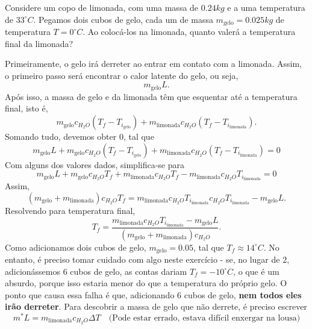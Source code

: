 \documentclass[phsyicsII_notes.tex]{subfiles}
\begin{document}
\begin{example}
	Considere um copo de limonada, com uma massa de \(0.24kg\) e a uma temperatura de \(33^{\circ{}}C.\)
	Pegamos dois cubos de gelo, cada um de massa \(m_{\text{gelo}} = 0.025kg\) de temperatura \(T = 0^{\circ{}}C.\) Ao colocá-los na limonada,
	quanto valerá a temperatura final da limonada?

	Primeiramente, o gelo irá derreter ao entrar em contato com a limonada. Assim, o primeiro passo será encontrar
	o calor latente do gelo, ou seja,
	\[
		m_{\text{gelo}}L.
	\]
	Após isso, a massa de gelo e da limonada têm que esquentar até a temperatura final, isto é,
	\[
		m_{\text{gelo}}c_{H_{2}O}(T_{f} - T_{i_{\text{gelo}}}) + m_{\text{limonada}}c_{H_{2}O}(T_{f}-T_{i_{\text{limonada}}}).
	\]
	Somando tudo, devemos obter 0, tal que
	\[
		m_{\text{gelo}}L + m_{\text{gelo}}c_{H_{2}O}(T_{f} - T_{i_{\text{gelo}}}) + m_{\text{limonada}}c_{H_{2}O}(T_{f}-T_{i_{\text{limonada}}}) = 0
	\]
	Com alguns dos valores dados, simplifica-se para
	\[
		m_{\text{gelo}}L + m_{\text{gelo}}c_{H_{2}O}T_{f} + m_{\text{limonada}}c_{H_{2}O}T_{f} - m_{\text{limonada}}c_{H_{2}O}T_{i_{\text{limonada}}} = 0
	\]
	Assim,
	\[
		(m_{\text{gelo}}+m_{\text{limonada}})c_{H_{2}O}T_{f} = m_{\text{limonada}}c_{H_{2}O}T_{i_{\text{limonada}}}c_{H_{2}O}T_{i_{\text{limonada}}} - m_{\text{gelo}}L.
	\]
	Resolvendo para temperatura final,
	\[
		T_{f} = \frac{m_{\text{limonada}}c_{H_{2}O}T_{i_{\text{limonada}}} - m_{\text{gelo}}L}{(m_{\text{gelo}}+m_{\text{limonada}})c_{H_{2}O}}.
	\]
	Como adicionamos dois cubos de gelo, \(m_{\text{gelo}} = 0.05\), tal que \(T_{f}\approx 14^{\circ{}}C\). No entanto, é preciso tomar cuidado com algo neste exercício -
	se, no lugar de 2, adicionássemos 6 cubos de gelo, as contas dariam \(T_{f} = -10^{\circ{}}C\), o que é um absurdo, porque isso estaria menor do que
	a temperatura do próprio gelo. O ponto que causa essa falha é que, adicionando 6 cubos de gelo, \textbf{nem todos eles irão derreter}. Para
	descobrir a massa de gelo que não derrete, é preciso escrever
	\[
		m^{*}L = m_{\text{limonada}}c_{H_{2}O}\Delta T\quad \text{(Pode estar errado, estava difícil enxergar na lousa)}
	\]
\end{example}
\end{document}
